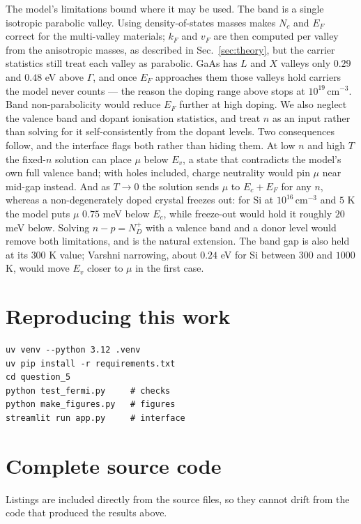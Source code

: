 \documentclass[aps,prb,reprint,nofootinbib]{revtex4-2}
\begin{document}
The model's limitations bound where it may be used. The band is a single isotropic parabolic
valley. Using density-of-states masses makes $N_c$ and $E_F$ correct for the multi-valley
materials; $k_F$ and $v_F$ are then computed per valley from the anisotropic masses, as
described in Sec.~\ref{sec:theory}, but the carrier statistics still treat each valley as
parabolic. GaAs has $L$ and $X$ valleys only $0.29$ and $0.48$ eV above $\Gamma$, and
once $E_F$ approaches them those valleys hold carriers the model never counts --- the reason the
doping range above stops at $10^{19}\,$cm$^{-3}$. Band non-parabolicity
would reduce $E_F$ further at high doping. We also neglect the valence band and dopant
ionisation statistics, and treat $n$ as an input rather than solving for it self-consistently
from the dopant levels. Two consequences follow, and the interface flags both rather than hiding
them. At low $n$ and high $T$ the fixed-$n$ solution can place $\mu$ below $E_v$, a state that
contradicts the model's own full valence band; with holes included, charge neutrality would pin
$\mu$ near mid-gap instead. And as $T\to0$ the solution sends $\mu$ to $E_c+E_F$ for any $n$,
whereas a non-degenerately doped crystal freezes out: for Si at $10^{16}\,$cm$^{-3}$ and $5$ K
the model puts $\mu$ $0.75$ meV below $E_c$, while freeze-out would hold it roughly $20$ meV
below. Solving $n-p=N_D^+$ with a valence band and a donor level would remove both
limitations, and is the natural extension. The band gap is also held at its $300$ K value;
Varshni narrowing, about $0.24$ eV for Si between $300$ and $1000$ K, would move $E_v$ closer to $\mu$ in the
first case.

\section*{Reproducing this work}

\begin{verbatim}
uv venv --python 3.12 .venv
uv pip install -r requirements.txt
cd question_5
python test_fermi.py     # checks
python make_figures.py   # figures
streamlit run app.py     # interface
\end{verbatim}

\onecolumngrid
\appendix

\section{Complete source code}

Listings are included directly from the source files, so they cannot drift from the code that
produced the results above.
\end{document}
